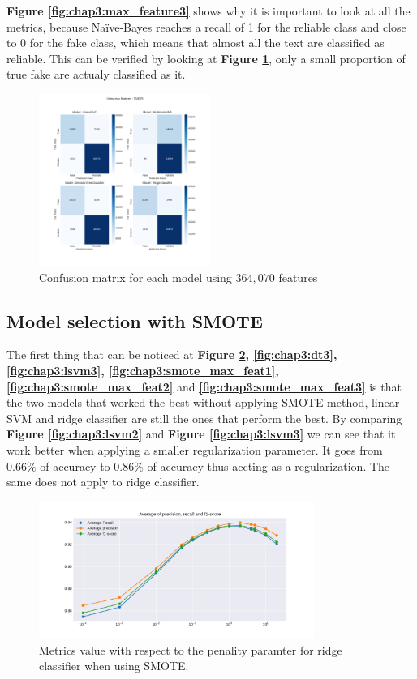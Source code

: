 \textbf{Figure \ref{fig:chap3:max_feature3}} shows why it is important to look at all the metrics, because Na\"{i}ve-Bayes reaches a recall of 1 for the reliable class and close to 0 for the fake class, which means that almost all the text are classified as reliable. This can be verified by looking at \textbf{Figure \ref{fig:chap3:confMat1}}, only a small proportion of true fake are actualy classified as it.

\begin{figure}
	\centering
	\includegraphics[width=0.5\textwidth]{images/chapitre3/confMat_fake_364070}
	\caption{Confusion matrix for each model using $364,070$ features}
	\label{fig:chap3:confMat1}
\end{figure}

\subsection{Model selection with SMOTE}
The first thing that can be noticed at \textbf{Figure \ref{fig:chap3:ridge3}, \ref{fig:chap3:dt3}, \ref{fig:chap3:lsvm3}, \ref{fig:chap3:smote_max_feat1}, \ref{fig:chap3:smote_max_feat2}} and \textbf{\ref{fig:chap3:smote_max_feat3}} is that the two models that worked the best without applying SMOTE method, linear SVM and ridge classifier are still the ones that perform the best. By comparing \textbf{Figure \ref{fig:chap3:lsvm2}} and \textbf{Figure \ref{fig:chap3:lsvm3}} we can see that it work better when applying a smaller regularization parameter. It goes from $0.66\%$ of accuracy to  $0.86\%$ of accuracy thus accting as a regularization. The same does not apply to ridge classifier. \\
\begin{figure}
	\centering
	\includegraphics[width=0.8\textwidth]{images/chapitre3/ridge+smote}
	\caption{Metrics value with respect to the penality paramter for ridge classifier when using SMOTE.}
	\label{fig:chap3:ridge3}
\end{figure}

